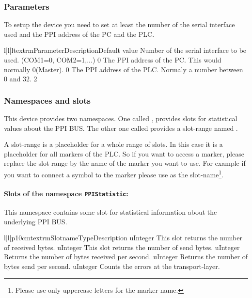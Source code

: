 \subsubsection{Parameters}
To setup the device you need to set at least the number of the serial 
interface used and the PPI address of the PC and the PLC.
\begin{tableiii}{l|l|l}{textrm}{Parameter}{Description}{Default value}
        {Number of the serial interface to be used. (COM1=0, COM2=1,...)}
        {0}
        {The PPI address of the PC. This would normally 0(Master).}
        {0}
        {The PPI address of the PLC. Normaly a number between 0 and 32.}
        {2}
\end{tableiii}

\subsubsection{Namespaces and slots}
This device provides two namespaces. One called , provides
slots for statistical values about the PPI BUS. The other one called 
 provides a slot-range named .

A slot-range is a placeholder for a whole range of slots. In this case it
is a placeholder for all markers of the PLC. So if you want to access a
marker, please replace the slot-range by the name of the marker you want 
to use. For example if you want to connect a symbol to the marker
 please use  as the 
slot-name\footnote{Please use only uppercase letters for the marker-name.}. 


\paragraph{Slots of the namespace \texttt{PPIStatistic}:}
This namespace contains some slot for statistical information about the 
underlying PPI BUS. 
\begin{tableiii}{l|l|p{10cm}}{textrm}{Slotname}{Type}{Description}
        {uInteger}
        {This slot returns the number of received bytes.}
        {uInteger}
        {This slot returns the number of send bytes.}
        {uInteger}
        {Returns the number of bytes received per second.}
        {uInteger}
        {Returns the number of bytes send per second.}
        {uInteger}
        {Counts the errors at the transport-layer.}
\end{tableiii}


